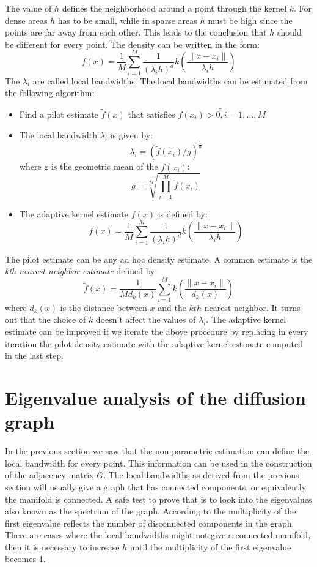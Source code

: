 \documentclass[12pt,letterpaper,doublespaced,ETD,dvips,proposal]{gtthesis}
\begin{document}
\begin{Body}
The value of $h$ defines the neighborhood around a point through the
kernel $k$. For dense areas $h$ has to be small, while in sparse
areas $h$ must be high since the points are far away from each
other. This leads to the conclusion that $h$ should be different for
every point. The density can be written in the form:
\[
    f(x)=\frac{1}{M}\sum_{i=1}^{M}\frac{1}{(\lambda_i h)^d}k(\frac{\parallel x-x_i
\parallel}{\lambda_i h})
\]
The $\lambda_i$ are called local bandwidths. The local bandwidths
can be estimated from the following algorithm:
\begin{itemize}
    \item Find a pilot estimate $\tilde{f}(x)$ that satisfies
         $\tilde{f(x_i)>0, i=1,\dots,M}$
    \item The local bandwidth $\lambda_i$ is given by:
        \[
            \lambda_i=(\tilde{f}(x_i)/g)^{\frac{1}{d}}
        \]
        where g is the geometric mean  of the $\tilde{f}(x_i)$:
        \[
            g=\sqrt[M]{\prod_{i=1}^{M}\tilde{f}(x_i)}
        \]
    \item The adaptive kernel estimate $f(x)$ is defined by:
         \[
            f(x)=\frac{1}{M}\sum_{i=1}^{M}\frac{1}{(\lambda_i
            h)^d} k\left( \frac{\parallel x-x_i \parallel}{\lambda_i h} \right)
        \]
\end{itemize}
The pilot estimate can be any ad hoc density estimate. A common
estimate is the \emph{kth  nearest neighbor estimate} defined by:
    \[
        \tilde{f}(x)=\frac{1}{Md_k(x)}\sum_{i=1}^{M}k\left(\frac{
        \parallel x-x_i \parallel}{d_k(x)}\right)
    \]
where $d_k(x)$ is the distance between $x$ and the $kth$ nearest
neighbor. It turns out that the choice of $k$ doesn't affect the
values of $\lambda_i$. The adaptive kernel estimate can be improved
if we iterate the above procedure by replacing in every iteration
the pilot density estimate with the adaptive kernel estimate
computed in the last step.
\section{Eigenvalue analysis of the diffusion graph}
In the previous section we saw that the non-parametric estimation
can  define the local bandwidth for every point. This information
can be used in the construction of the adjacency matrix $G$. The
local bandwidths as derived from the previous section will usually
give a graph that has connected components, or equivalently the
manifold is connected. A  safe test to prove that is to look into
the eigenvalues also known as the spectrum of the graph. According
to \cite{Cvetkovic} the multiplicity of the first eigenvalue
reflects the number of disconnected components in the graph. There
are cases where the local bandwidths might not give a connected
manifold, then it is necessary to increase $h$ until the
multiplicity of the first eigenvalue becomes 1.


\end{Body}
\end{document}
